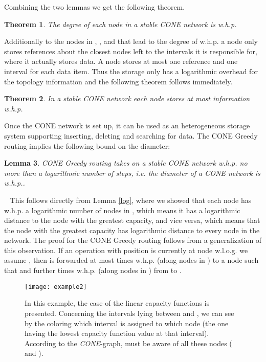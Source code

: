 \documentclass[11pt]{article}
\newtheorem{theorem}{Theorem}[section]
\newtheorem{lemma}[theorem]{Lemma}
\newcommand{\sq}{\hbox{\rlap{}}}
\newcommand{\qed}{\hspace*{\fill}\sq}
\newenvironment{proof}{\noindent {\bf Proof.}\ }{\qed\par\vskip 4mm\par}
\begin{document}
Combining the two lemmas we get the following theorem.

\begin{theorem}\label{theo:degree}
The degree of each node in a stable CONE network is  w.h.p.
\end{theorem}

Additionally to the nodes in , ,  and  that lead to the degree of  w.h.p. a node  only stores references about the closest nodes left to the intervals it is responsible for, where it actually stores data. A node  stores at most one reference and one interval for each data item. Thus the storage only has a logarithmic overhead for the topology information and the following theorem follows immediately.

\begin{theorem}\label{theo:storage}
In a stable CONE network each node stores at most  information w.h.p.
\end{theorem}

Once the CONE network  is set up, it can be used as an heterogeneous storage system supporting inserting, deleting and searching for data.
The CONE Greedy routing implies the following bound on the diameter:

\begin{lemma}\label{lem:routing}
CONE Greedy routing takes on a stable CONE network w.h.p. no more than a logarithmic number of steps, i.e. the diameter of a CONE network is  w.h.p..
\end{lemma}

\begin{proof}
This follows directly from Lemma \ref{log}, where we showed that each node  has w.h.p. a logarithmic number of nodes in , which means it has a logarithmic distance to the node with the greatest capacity, and vice versa, which means that the node with the greatest capacity has logarithmic distance to every node in the network. The proof for the CONE Greedy routing follows from a generalization of this observation. If an operation  with position  is currently at node  w.l.o.g. we assume , then  is forwarded at most  times w.h.p. (along nodes in ) to a node  such that   and further  times w.h.p. (along nodes in ) from  to .
\end{proof}

\begin{figure}[htb]
\caption{In this example, the case of the linear capacity functions is presented.
Concerning the intervals lying between  and ,
we can see by the coloring which interval is assigned to which node (the one having the lowest capacity function value at that interval). According to the \emph{CONE}-graph, 
must be aware of all these nodes ( and ).}

\texttt{[image: example2]}\label{example}
\end{figure}
\end{document}
